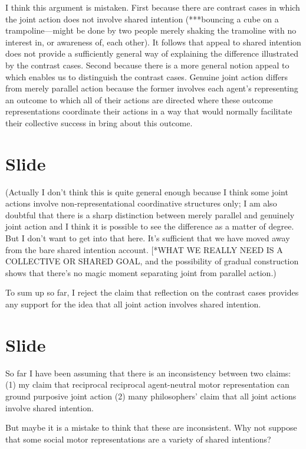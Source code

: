\documentclass[12pt,\papersize]{extarticle}
\begin{document}
I think this argument is mistaken.
First because there are contrast cases in which the joint action does not involve shared intention (***bouncing a cube on a trampoline---might be done by two people merely shaking the tramoline with no interest in, or awareness of, each other).
It follows that appeal to shared intention does not provide a sufficiently general way of explaining the difference illustrated by the contrast cases.
Second because there is a more general notion appeal to which enables us to distinguish the contrast cases.
Genuine joint action differs from merely parallel action because the former involves each agent’s representing an outcome to which all of their actions are directed where these outcome representations coordinate their actions in a way that would normally facilitate their collective success in bring about this outcome.



\section{Slide}
(Actually I don’t think this is quite general enough because I think some joint actions involve non-representational coordinative structures only; I am also doubtful that there is a sharp distinction between merely parallel and genuinely joint action and I think it is possible to see the difference as a matter of degree. But I don’t want to get into that here.  It’s sufficient that we have moved away from the bare shared intention account. [*WHAT WE REALLY NEED IS A COLLECTIVE OR SHARED GOAL, and the possibility of gradual construction shows that there’s no magic moment separating joint from parallel action.)

To sum up so far, I reject the claim that reflection on the contrast cases provides any support for the idea that all joint action involves shared intention.



\section{Slide}
So far I have been assuming that there is an inconsistency between two claims:
(1) my claim that reciprocal reciprocal agent-neutral motor representation can ground purposive joint action
(2) many philosophers’ claim that all joint actions involve shared intention.

But maybe it is a mistake to think that these are inconsistent.
Why not suppose that some social motor representations are a variety of shared intentions?
\end{document}
